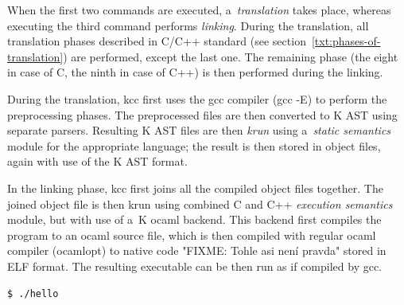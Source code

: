 \documentclass{fithesis3}
\begin{document}
When the first two commands are executed, a~\textit{translation} takes place, whereas executing the third command performs \textit{linking}. During the translation, all translation phases described in C/C++ standard (see section~\ref{txt:phases-of-translation}) are performed, except the last one. The remaining phase (the eight in case of C, the ninth in case of C++) is then performed during the linking.

During the translation, kcc first uses the gcc compiler (gcc -E) to perform the preprocessing phases. The preprocessed files are then converted to K AST using separate parsers. Resulting K AST files are then \textit{krun} using a~\textit{static semantics} module for the appropriate language; the result is then stored in object files, again with use of the K AST format.

In the linking phase, kcc first joins all the compiled object files together. The joined object file is then krun using combined C and C++ \textit{execution semantics} module, but with use of a~K ocaml backend. This backend first compiles the program to an ocaml source file, which is then compiled with regular ocaml compiler (ocamlopt) to native code "FIXME: Tohle asi není pravda" stored in ELF format. The resulting executable can be then run as if compiled by gcc.

\begin{lstlisting}[language=bash]
$ ./hello
\end{lstlisting}




\end{document}

